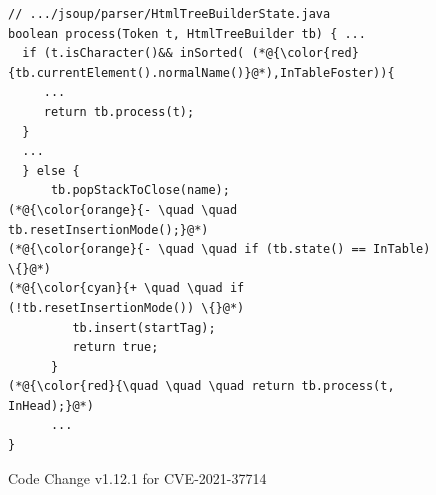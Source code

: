 \begin{figure}
     \centering
     \begin{minipage}{0.45\textwidth}
\centering
{}
	\begin{lstlisting}[]
// .../jsoup/parser/HtmlTreeBuilderState.java
boolean process(Token t, HtmlTreeBuilder tb) { ...
  if (t.isCharacter()&& inSorted( (*@{\color{red}{tb.currentElement().normalName()}@*),InTableFoster)){
     ...
     return tb.process(t);
  }
  ...
  } else {
      tb.popStackToClose(name);
(*@{\color{orange}{- \quad \quad tb.resetInsertionMode();}@*)
(*@{\color{orange}{- \quad \quad if (tb.state() == InTable) \{}@*)
(*@{\color{cyan}{+ \quad \quad if (!tb.resetInsertionMode()) \{}@*)
         tb.insert(startTag);
         return true;
      }
(*@{\color{red}{\quad \quad \quad return tb.process(t, InHead);}@*)
      ...
}
	\end{lstlisting}
         \caption{Code Change v1.12.1 for CVE-2021-37714}
         \label{fig:motiv-code}
     \end{minipage}
     \hfill
     \begin{minipage}{0.5\textwidth}



\end{minipage}
\end{figure}
